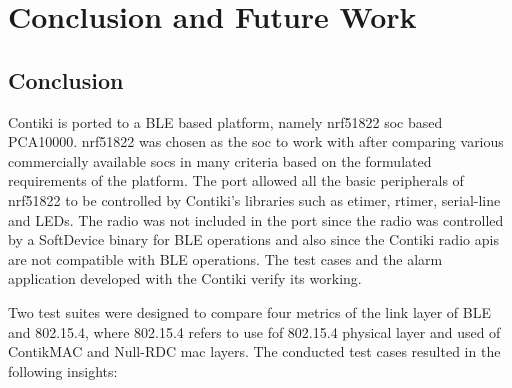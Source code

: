 \chapter{Conclusion and Future Work}

\section{Conclusion}

Contiki is ported to a BLE based platform, namely nrf51822 \gls{soc} based PCA10000. nrf51822 was chosen as the \gls{soc} to work with after comparing various commercially available \glspl{soc} in many criteria based on the formulated requirements of the platform. The port allowed all the basic peripherals of nrf51822 to be controlled by Contiki's libraries such as etimer, rtimer, serial-line and LEDs.  The radio was not included in the port since the radio was controlled by a SoftDevice binary for BLE operations and also since the Contiki radio \glspl{api} are not compatible with BLE operations. The test cases and the alarm application developed with the Contiki verify its working.

Two test suites were designed to compare four metrics of the link layer of BLE and 802.15.4, where 802.15.4 refers to use fof 802.15.4 physical layer and used of ContikMAC and Null-RDC \gls{mac} layers. The conducted test cases resulted in the following insights:

